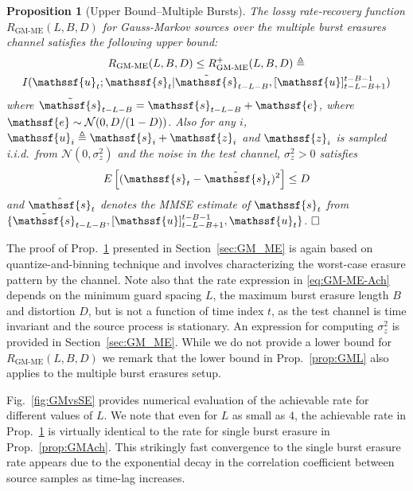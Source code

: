 \documentclass[journal, twocolumn, 10pt]{IEEEtran}
\newtheorem{prop}{Proposition}
\newcommand{\rve}{{\mathssf{e}}}    %
\newcommand{\rvs}{{\mathssf{s}}}    %
\newcommand{\rvu}{{\mathssf{u}}}    %
\newcommand{\rvz}{{\mathssf{z}}}    %
\begin{document}
\begin{prop}[Upper Bound--Multiple Bursts]
\label{prop:GM-ME}
The lossy rate-recovery function  $R_{\textrm{GM-ME}}(L,B,D)$  for Gauss-Markov sources over the multiple burst erasures channel satisfies the following upper bound:
\begin{multline}
R_{\textrm{GM-ME}}(L,B,D) \le R_{\textrm{GM-ME}}^{+}(L,B,D)\triangleq \\ I(\rvu_{t};\rvs_{t} | \tilde{\rvs}_{t-L-B}, [\rvu]_{t-L-B+1}^{t-B-1}) \label{eq:GM-ME-Ach}
\end{multline} where $\tilde{\rvs}_{t-L-B} = {\rvs}_{t-L-B} +\rve$, where $\rve\sim \mathcal{N}(0, D/(1-D))$. Also for any $i$, $\rvu_{i} \triangleq \rvs_{i} + \rvz_{i}$ and $\rvz_{i}$ is sampled i.i.d.\ from $\mathcal{N}(0, \sigma^2_{z})$ and the noise in the test channel, $\sigma^{2}_{z}>0$  satisfies
\begin{align}
E\left[(\rvs_{t}-\hat{\rvs}_t)^2\right] \le D \label{eq:GM-ME-Ach-D}
\end{align}  and $\hat{\rvs}_{t}$ denotes the MMSE estimate of $\rvs_{t}$ from $\{\tilde{\rvs}_{t-L-B}, [\rvu]_{t-L-B+1}^{t-B-1}, \rvu_{t}\}$. $\hfill\Box$
\end{prop}

The proof of Prop.~\ref{prop:GM-ME} presented in Section~\ref{sec:GM_ME} is again based on quantize-and-binning technique and involves characterizing the worst-case erasure pattern by the channel. 
Note also that the rate expression in \eqref{eq:GM-ME-Ach} depends on the minimum guard spacing $L$, the maximum burst erasure length $B$ and distortion $D$, but  is not a function of time index $t$, as the test channel is time invariant and the source process is stationary. An expression for computing $\sigma_z^2$ is provided in Section~\ref{sec:GM_ME}. While we do not provide a lower bound for $R_{\textrm{GM-ME}}(L,B,D)$
we remark that the lower bound in Prop.~\ref{prop:GML} also applies to the multiple burst erasures setup.


Fig.~\ref{fig:GMvsSE} provides numerical evaluation of the achievable rate for different values of $L$. We note that even for  $L$ as small as $4$,  the achievable rate in Prop.~\ref{prop:GM-ME} is virtually identical to the rate for single burst erasure in Prop.~\ref{prop:GMAch}. This strikingly fast convergence to the single burst erasure rate appears due to the exponential decay in  the correlation coefficient between source samples as time-lag increases.
\end{document}
